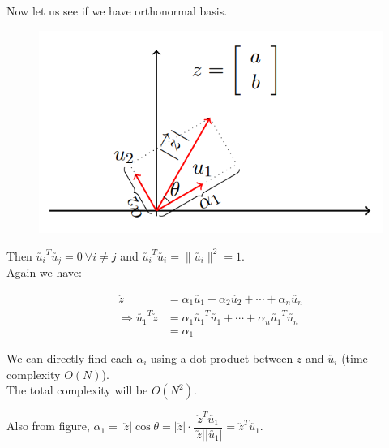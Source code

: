 \documentclass[11pt, a4paper]{article}
\begin{document}
\leftpointright \hspace{0.3cm} Now let us see if we have orthonormal basis.

\begin{figure}[!htbp]

\centering

\includegraphics[scale=0.5]{image_5.png}

\end{figure}

Then $\utilde{u_i}^T \utilde{u_j} = 0 \ \forall i \neq j$ and $\utilde{u_i}^T \utilde{u_i} = \| \utilde{u_i} \|^2 = 1$. \\[0.3cm]

Again we have:

\begin{align*}
\utilde{z} &= \alpha_1 \utilde{u_1} + \alpha_2 \utilde{u_2} + \cdots + \alpha_n \utilde{u_n} \\ 
\Rightarrow \utilde{u_1}^T \utilde{z} &= \alpha_1 \utilde{u_1}^T \utilde{u_1} + \cdots + \alpha_n \utilde{u_1}^T \utilde{u_n} \\ &= \alpha_1
\end{align*}

We can directly find each \( \alpha_i \) using a dot product between \( z \) and \( \utilde{u_i} \)
(time complexity \( O(N) \)). \\[0.3cm]

The total complexity will be $O(N^2)$.

\newpage

Also from figure, $\alpha_1 = |\utilde{z}| \cos \theta = |\utilde{z}| \cdot \dfrac{\utilde{z}^T \utilde{u_1}}{|\utilde{z}| |\utilde{u_1}|} = \utilde{z}^T \utilde{u_1}$. \\

\vspace{0.3cm}
\end{document}
